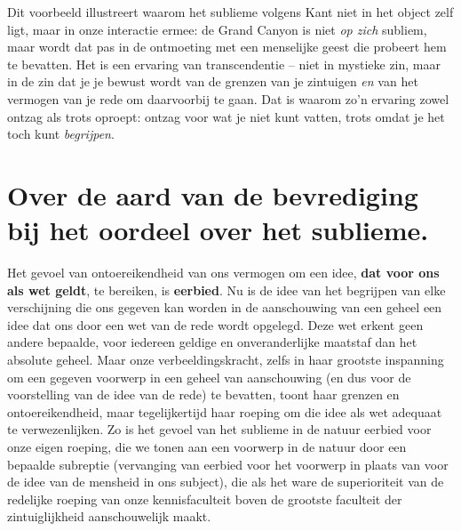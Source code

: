 \begin{mdframed}[leftmargin=0pt,rightmargin=0pt,backgroundcolor=blue!6,linecolor=white,innertopmargin=6pt,innerbottommargin=6pt]
Dit voorbeeld illustreert waarom het sublieme volgens Kant niet in het object zelf ligt, maar in onze interactie ermee: de Grand Canyon is niet \textit{op zich} subliem, maar wordt dat pas in de ontmoeting met een menselijke geest die probeert hem te bevatten. Het is een ervaring van transcendentie – niet in mystieke zin, maar in de zin dat je je bewust wordt van de grenzen van je zintuigen \textit{en} van het vermogen van je rede om daarvoorbij te gaan. Dat is waarom zo’n ervaring zowel ontzag als trots oproept: ontzag voor wat je niet kunt vatten, trots omdat je het toch kunt \textit{begrijpen}.

\end{mdframed}

\section{Over de aard van de bevrediging bij het oordeel over het sublieme.}

Het gevoel van ontoereikendheid van ons vermogen om een idee, \textbf{dat voor ons als wet geldt}, te bereiken, is \textbf{eerbied}. Nu is de idee van het begrijpen van elke verschijning die ons gegeven kan worden in de aanschouwing van een geheel een idee dat ons door een wet van de rede wordt opgelegd. Deze wet erkent geen andere bepaalde, voor iedereen geldige en onveranderlijke maatstaf dan het absolute geheel. Maar onze verbeeldingskracht, zelfs in haar grootste inspanning om een gegeven voorwerp in een geheel van aanschouwing (en dus voor de voorstelling van de idee van de rede) te bevatten, toont haar grenzen en ontoereikendheid, maar tegelijkertijd haar roeping om die idee als wet adequaat te verwezenlijken. Zo is het gevoel van het sublieme in de natuur eerbied voor onze eigen roeping, die we tonen aan een voorwerp in de natuur door een bepaalde subreptie (vervanging van eerbied voor het voorwerp in plaats van voor de idee van de mensheid in ons subject), die als het ware de superioriteit van de redelijke roeping van onze kennisfaculteit boven de grootste faculteit der zintuiglijkheid aanschouwelijk maakt.


